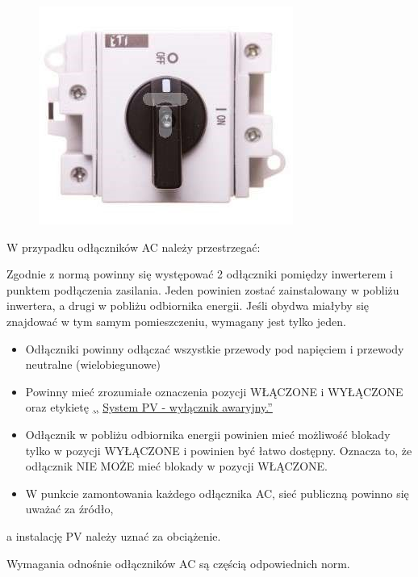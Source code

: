 \documentclass[12pt,a4paper]{article}
\begin{document}
\begin{figure}[h]
\centering
\includegraphics[natwidth=7.57cm,natheight=6.48cm]{media/image23.jpg}
\end{figure} 

W przypadku odłączników AC należy przestrzegać: 

Zgodnie z normą powinny się występować 2 odłączniki pomiędzy 
inwerterem i punktem podłączenia zasilania. Jeden powinien zostać 
zainstalowany w pobliżu inwertera, a drugi w pobliżu odbiornika energii. Jeśli obydwa miałyby się znajdować w tym samym pomieszczeniu, wymagany jest tylko jeden. 

\begin{itemize}
\item Odłączniki powinny odłączać wszystkie przewody pod napięciem i 
przewody neutralne (wielobiegunowe) 
\item Powinny mieć zrozumiałe oznaczenia pozycji WŁĄCZONE i WYŁĄCZONE 
oraz etykietę \underline{,,} \underline{System PV - wyłącznik 
awaryjny.''} 
\item Odłącznik w pobliżu odbiornika energii powinien mieć możliwość 
blokady tylko w pozycji WYŁĄCZONE i powinien być łatwo dostępny. Oznacza 
to, że odłącznik NIE MOŻE mieć blokady w pozycji WŁĄCZONE. 
\item W punkcie zamontowania każdego odłącznika AC, sieć publiczną 
powinno się uważać za źródło, 
\end{itemize}
a instalację PV należy uznać za obciążenie. 

\begin{center}Wymagania odnośnie odłączników AC są częścią odpowiednich 
norm. \end{center}
\end{document}

